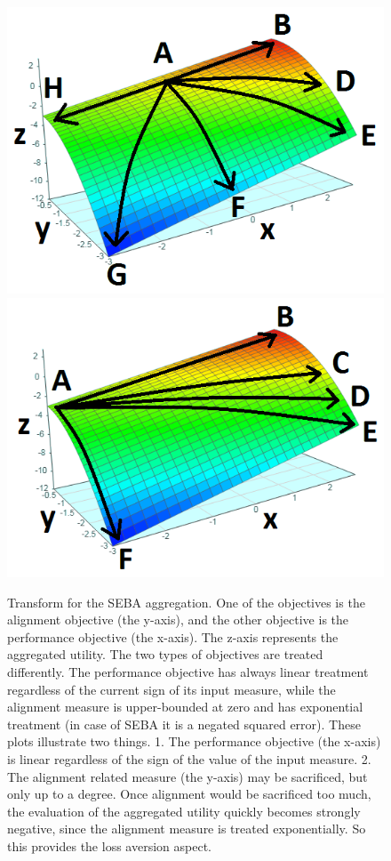 \begin{figure}[h]
 
  \includegraphics[width=\columnwidth]{output/seba1b.png}
  \includegraphics[width=\columnwidth]{output/seba2b.png}
  \caption{Transform for the SEBA aggregation. One of the objectives is the alignment objective (the y-axis), and the other objective is the performance objective (the x-axis). The z-axis represents the aggregated utility. The two types of objectives are treated differently. The performance objective has always linear treatment regardless of the current sign of its input measure, while the alignment measure is upper-bounded at zero and has exponential treatment (in case of SEBA it is a negated squared error). These plots illustrate two things. 1. The performance objective (the x-axis) is linear regardless of the sign of the value of the input measure. 2. The alignment related measure (the y-axis) may be sacrificed, but only up to a degree. Once alignment would be sacrificed too much, the evaluation of the aggregated utility quickly becomes strongly negative, since the alignment measure is treated exponentially. So this provides the loss aversion aspect.}
  \label{fig:seba_transform_functions_3d}
\end{figure}

